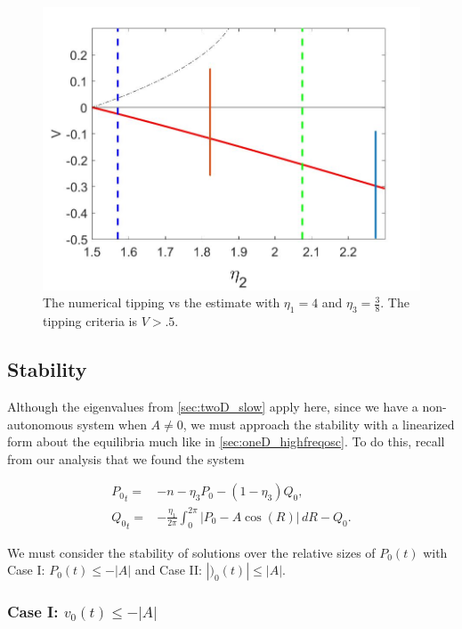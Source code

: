 \begin{figure}[H]
\centering
\includegraphics[scale=.25]{twoD/osc_Omegacomp.jpg}
\caption{The numerical tipping vs the estimate with $\eta_1=4$ and $\eta_3=\frac{3}{8}$. The tipping criteria is $V>.5$.}
\label{fig:twoD_osc_epscomp}
\end{figure}

\subsection{Stability}

Although the eigenvalues from \autoref{sec:twoD_slow} apply here, since we have a non-autonomous system when $A\not=0$, we must approach the stability with a linearized form about the equilibria much like in \autoref{sec:oneD_highfreqosc}. To do this, recall from our analysis that we found the system

\begin{equation}\label{eq:twoD_osc_stabilityequation}
\begin{aligned}
{P_0}_t =& -n -\eta_3 P_0-(1-\eta_3)Q_0,\\
{Q_0}_t =& -\frac{\eta_1}{2\pi}\int_0^{2\pi}|P_0-A\cos(R)|\, dR - Q_0.
\end{aligned}
\end{equation}

We must consider the stability of solutions over the relative sizes of $P_0(t)$ with Case I: $P_0(t)\le -|A|$ and Case II: $|)_0(t)|\le |A|$.

\subsubsection{Case I: $v_0(t)\le -|A|$}

